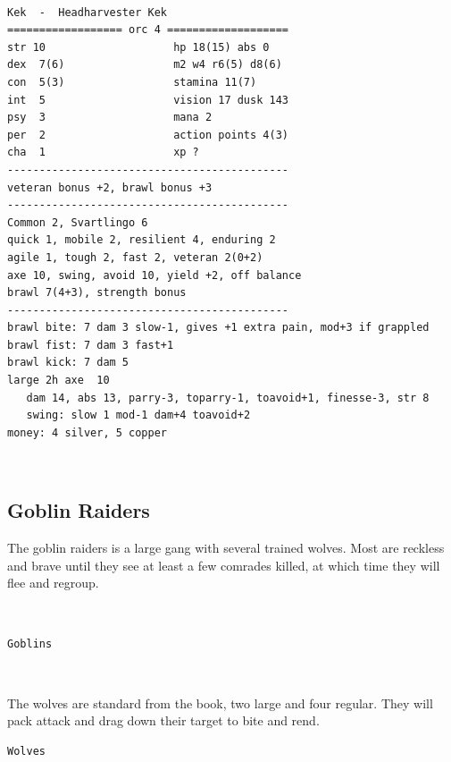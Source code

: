 \


\begin{samepage} \small \begin{verbatim}
Kek  -  Headharvester Kek
================== orc 4 ===================
str 10                    hp 18(15) abs 0
dex  7(6)                 m2 w4 r6(5) d8(6)
con  5(3)                 stamina 11(7)
int  5                    vision 17 dusk 143
psy  3                    mana 2
per  2                    action points 4(3)
cha  1                    xp ?
--------------------------------------------
veteran bonus +2, brawl bonus +3
--------------------------------------------
Common 2, Svartlingo 6
quick 1, mobile 2, resilient 4, enduring 2
agile 1, tough 2, fast 2, veteran 2(0+2)
axe 10, swing, avoid 10, yield +2, off balance
brawl 7(4+3), strength bonus
--------------------------------------------
brawl bite: 7 dam 3 slow-1, gives +1 extra pain, mod+3 if grappled
brawl fist: 7 dam 3 fast+1
brawl kick: 7 dam 5
large 2h axe  10
   dam 14, abs 13, parry-3, toparry-1, toavoid+1, finesse-3, str 8
   swing: slow 1 mod-1 dam+4 toavoid+2
money: 4 silver, 5 copper
\end{verbatim} \normalsize \end{samepage}

\








\goodbreak
{}
\subsection*{Goblin Raiders}
\label{sec:goblinstats}
The goblin raiders is a large gang with several trained wolves. Most are reckless and brave until they see at least a few comrades killed, at which time they will flee and regroup.

\

\begin{samepage} \small \begin{verbatim}
Goblins
\end{verbatim} \normalsize \end{samepage}

\

The wolves are standard from the book, two large and four regular. They will pack attack and drag down their target to bite and rend.
\begin{samepage} \small \begin{verbatim}
Wolves
\end{verbatim} \normalsize \end{samepage}

